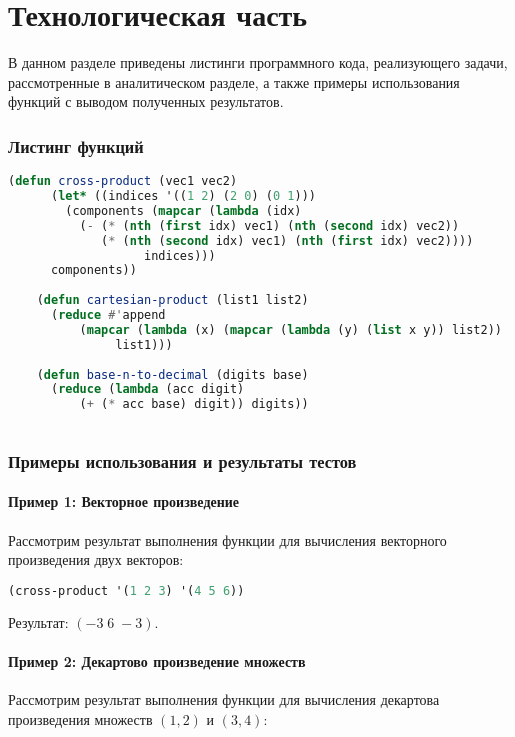 \chapter{Технологическая часть}

В данном разделе приведены листинги программного кода, реализующего задачи, рассмотренные в аналитическом разделе, а также примеры использования функций с выводом полученных результатов.

\subsection{Листинг функций}
\begin{lstlisting}[language=Lisp]
	(defun cross-product (vec1 vec2)
	  (let* ((indices '((1 2) (2 0) (0 1)))
	    (components (mapcar (lambda (idx)
	      (- (* (nth (first idx) vec1) (nth (second idx) vec2))
	         (* (nth (second idx) vec1) (nth (first idx) vec2))))
	               indices)))
	  components))
	
	(defun cartesian-product (list1 list2)
	  (reduce #'append
	      (mapcar (lambda (x) (mapcar (lambda (y) (list x y)) list2))
      	       list1)))
	
	(defun base-n-to-decimal (digits base)
	  (reduce (lambda (acc digit) 
	      (+ (* acc base) digit)) digits))
	
\end{lstlisting}

\subsection{Примеры использования и результаты тестов}
\subsubsection*{Пример 1: Векторное произведение}
Рассмотрим результат выполнения функции для вычисления векторного произведения двух векторов:

\begin{lstlisting}[language=Lisp,caption={Векторное произведение}]
	(cross-product '(1 2 3) '(4 5 6)) 
\end{lstlisting}

Результат: \((-3 \; 6 \; -3)\).

\subsubsection*{Пример 2: Декартово произведение множеств}
Рассмотрим результат выполнения функции для вычисления декартова произведения множеств \((1, 2)\) и \((3, 4)\):

